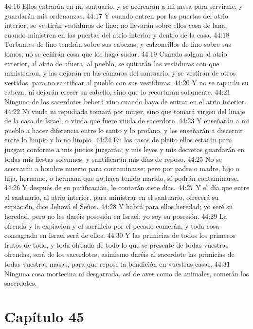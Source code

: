 44:16 Ellos entrarán en mi santuario, y se acercarán a mi mesa para servirme, y guardarán mis ordenanzas.   
44:17 Y cuando entren por las puertas del atrio interior, se vestirán vestiduras de lino; no llevarán sobre ellos cosa de lana, cuando ministren en las puertas del atrio interior y dentro de la casa.   
44:18 Turbantes de lino tendrán sobre sus cabezas, y calzoncillos de lino sobre sus lomos; no se ceñirán cosa que los haga sudar.   
44:19 Cuando salgan al atrio exterior, al atrio de afuera, al pueblo, se quitarán las vestiduras con que ministraron, y las dejarán en las cámaras del santuario, y se vestirán de otros vestidos, para no santificar al pueblo con sus vestiduras.   
44:20 Y no se raparán su cabeza, ni dejarán crecer su cabello, sino que lo recortarán solamente.   
44:21 Ninguno de los sacerdotes beberá vino cuando haya de entrar en el atrio interior. 
44:22 Ni viuda ni repudiada tomará por mujer, sino que tomará virgen del linaje de la casa de Israel, o viuda que fuere viuda de sacerdote. 
44:23 Y enseñarán a mi pueblo a hacer diferencia entre lo santo y lo profano, y les enseñarán a discernir entre lo limpio y lo no limpio. 
44:24 En los casos de pleito ellos estarán para juzgar; conforme a mis juicios juzgarán; y mis leyes y mis decretos guardarán en todas mis fiestas solemnes, y santificarán mis días de reposo.   
44:25 No se acercarán a hombre muerto para contaminarse; pero por padre o madre, hijo o hija, hermano, o hermana que no haya tenido marido, sí podrán contaminarse.   
44:26 Y después de su purificación, le contarán siete días.   
44:27 Y el día que entre al santuario, al atrio interior, para ministrar en el santuario, ofrecerá su expiación, dice Jehová el Señor.   
44:28 Y habrá para ellos heredad; yo seré su heredad, pero no les daréis posesión en Israel; yo soy su posesión.   
44:29 La ofrenda y la expiación y el sacrificio por el pecado comerán, y toda cosa consagrada en Israel será de ellos.   
44:30 Y las primicias de todos los primeros frutos de todo, y toda ofrenda de todo lo que se presente de todas vuestras ofrendas, será de los sacerdotes; asimismo daréis al sacerdote las primicias de todas vuestras masas, para que repose la bendición en vuestras casas. 
44:31 Ninguna cosa mortecina ni desgarrada, así de aves como de animales, comerán los sacerdotes. 
\section*{Capítulo 45  }
  
